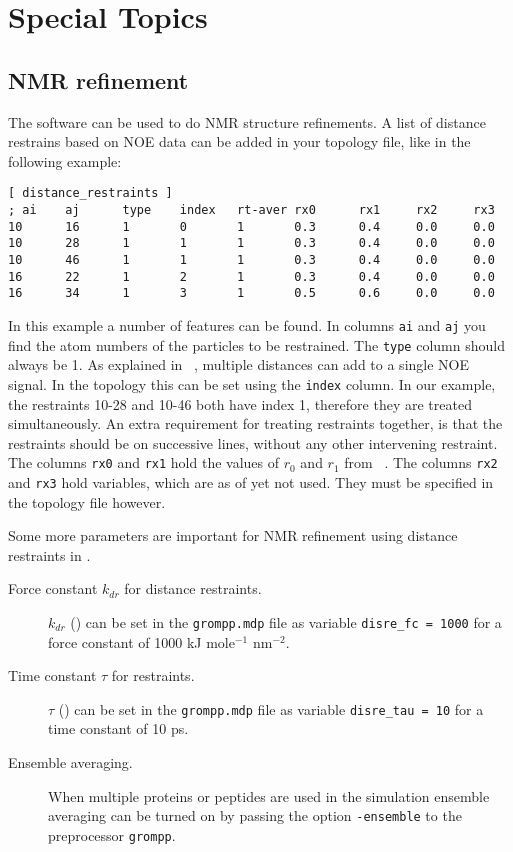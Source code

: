\chapter{Special Topics}
\label{ch:special}
\section{NMR refinement}
The {\gromacs} software can be used to do NMR structure refinements.
A list of distance restrains based on NOE data can be added in your
topology file, like in the following example:
\begin{verbatim}
[ distance_restraints ]
; ai    aj      type    index   rt-aver rx0      rx1     rx2     rx3
10      16      1       0       1       0.3      0.4     0.0     0.0 
10      28      1       1       1       0.3      0.4     0.0     0.0 
10      46      1       1       1       0.3      0.4     0.0     0.0 
16      22      1       2       1       0.3      0.4     0.0     0.0 
16      34      1       3       1       0.5      0.6     0.0     0.0 
\end{verbatim}
In this example a number of features can be found.
In columns {\tt ai} and {\tt aj} you find the atom numbers of the
particles to be restrained. The {\tt type} column should always be 1.
As explained in ~, multiple distances can add
to a single NOE signal. In the topology this can be set using the
{\tt index} column. In our example, the restraints 10-28 and 10-46
both have index 1, therefore they are treated simultaneously.
An extra requirement for treating restraints together, is that 
the restraints should be on successive lines, without any
other intervening restraint. The columns {\tt rx0} and {\tt rx1} hold
the values of $r_0$ and $r_1$ from ~.
The columns {\tt rx2} and {\tt rx3} hold variables, which are as of yet 
not used. They must be specified in the topology file however.

Some more parameters are important for NMR refinement using
distance restraints in {\gromacs}.
\begin{description}
\item[Force constant $k_{dr}$ for distance restraints.] 
	$k_{dr}$  () can be set in the {\tt grompp.mdp} file
	as variable {\tt disre\_fc = 1000} for a force constant of
	1000 {kJ mole$^{-1}$ nm$^{-2}$}.
\item[Time constant $\tau$ for restraints.] 
	$\tau$ () can be set in the {\tt grompp.mdp} file
	as variable {\tt disre\_tau = 10} for a time constant of
	10 ps.
\item[Ensemble averaging.] When multiple proteins or peptides are used
	in the simulation ensemble averaging 
	can be turned on by passing the option
	{\tt -ensemble} to the {\gromacs} preprocessor {\tt grompp}.
\end{description}



